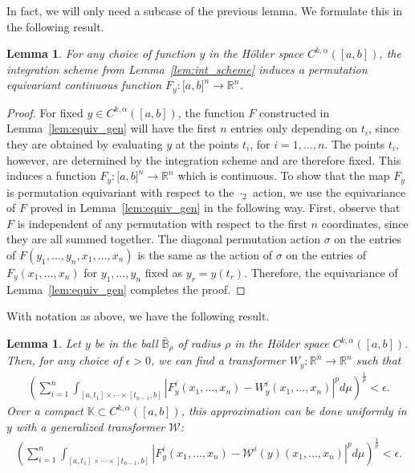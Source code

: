 \documentclass[a4paper,12pt,reqno]{amsart}
\newtheorem{lem}[thm]{Lemma}
\theoremstyle{definition}
\theoremstyle{remark}
\begin{document}
In fact, we will only need a subcase of the previous lemma. We formulate this in the following result. 

\begin{lem}\label{lem:equiv}
    For any choice of function $y$ in the H\"older space $C^{k,\alpha}([a,b])$, the integration scheme from Lemma~\ref{lem:int_scheme} induces a permutation equivariant continuous function $F_y: \mathbb [a,b]^n \longrightarrow \mathbb R^n$.
\end{lem}
\begin{proof}
    For fixed $y\in C^{k,\alpha}([a,b])$, the function $F$ constructed in Lemma~\ref{lem:equiv_gen} will have the first $n$ entries only depending on $t_i$, since they are obtained by evaluating $y$ at the points $t_i$, for $i= 1, \ldots , n$. The points $t_i$, however, are determined by the integration scheme and are therefore fixed. 
    This induces a function $F_y : \mathbb [a,b]^n \longrightarrow \mathbb R^n$ which is continuous. To show that the map $F_y$ is permutation equivariant with respect to the $\cdot_2$ action, we use the equivariance of $F$ proved in Lemma~\ref{lem:equiv_gen} in the following way. First, observe that $F$ is independent of any permutation with respect to the first $n$ coordinates, since they are all summed together. The diagonal permutation action $\sigma$ on the entries of $F(y_1, \ldots , y_n, x_1,\ldots , x_n)$ is the same as the action of $\sigma$ on the entries of $F_y(x_1, \ldots , x_n)$ for $y_1, \ldots , y_n$ fixed as $y_r = y(t_r)$. Therefore, the equivariance of Lemma~\ref{lem:equiv_gen} completes the proof.
\end{proof}
With notation as above, we have the following result. 
\begin{lem}\label{lem:int_trans}
    Let $y$ be in the ball $\bar{\mathbb B}_\rho$ of radius $\rho$ in the H\"older space $C^{k,\alpha}([a,b])$. Then, for any choice of $\epsilon >0$,  we can find a transformer $W_y: \mathbb R^n \longrightarrow \mathbb R^n$ such that
    \begin{eqnarray}\label{eqn:local_transformer}
        \left (\sum_{i=1}^n \int_{[a,t_1]\times \cdots \times [t_{n-1},b]}|F^i_y(x_1,\ldots,x_n)- W^i_y(x_1,\ldots,x_n)|^pd\mu\right )^\frac{1}{p} < \epsilon.
    \end{eqnarray} 
    Over a compact $\mathbb K \subset C^{k,\alpha}([a,b])$, this approximation can be done uniformly in $y$ with a generalized transformer $\mathcal W$: 
    \begin{eqnarray}\label{eqn:total_transformer}
        \left (\sum_{i=1}^n \int_{[a,t_1]\times \cdots \times [t_{n-1},b]}|F^i_y(x_1,\ldots,x_n)- \mathcal W^i(y)(x_1,\ldots,x_n)|^pd\mu\right )^\frac{1}{p} < \epsilon.
    \end{eqnarray} 
\end{lem}
\end{document}

